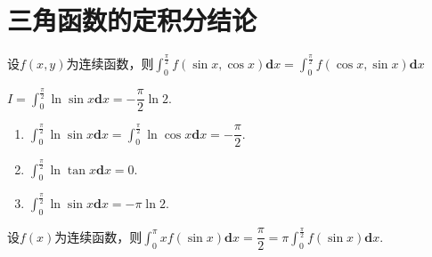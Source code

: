 \section{三角函数的定积分结论}

\begin{theorem}
	设$f(x,y)$为连续函数，则$\int_{0}^{\frac{\pi}{2}}f(\sin{x},\cos{x})\textbf{d}x = \int_{0}^{\frac{\pi}{2}}f(\cos{x},\sin{x})\textbf{d}x$
\end{theorem}

\begin{proposition}[欧拉积分]
	$I = \int_{0}^{\frac{\pi}{2}}\ln{\sin{x}}\textbf{d}x = -\dfrac{\pi}{2}\ln{2}.$
\end{proposition}

\begin{corollary}
	\begin{enumerate}
		\item $\int_{0}^{\frac{\pi}{2}}\ln{\sin{x}}\textbf{d}x = \int_{0}^{\frac{\pi}{2}}\ln{\cos{x}}\textbf{d}x = -\dfrac{\pi}{2}.$
		\item $\int_{0}^{\frac{\pi}{2}}\ln{\tan{x}}\textbf{d}x = 0.$
		\item $\int_{0}^{\frac{\pi}{2}}\ln{\sin{x}}\textbf{d}x = -\pi\ln{2}.$
	\end{enumerate}
\end{corollary}

\begin{proposition}
	设$f(x)$为连续函数，则$\int_{0}^{\pi}xf(\sin{x})\textbf{d}x = \dfrac{\pi}{2} = \pi\int_{0}^{\frac{\pi}{2}}f(\sin{x})\textbf{d}x.$
\end{proposition}

